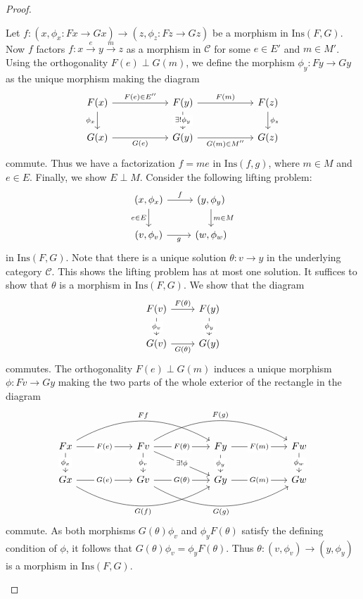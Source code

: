 \documentclass[11pt]{article}
\theoremstyle{plain}
\theoremstyle{definition}
\numberwithin{equation}{section}
\newcommand{\C}{\mathcal{C}}
\newcommand{\Ins}{\mathrm{Ins}}
\begin{document}
\begin{proof}
\begin{enumerate}
   Let $f\colon (x,\phi_x\colon Fx\to Gx)\to (z,\phi_z\colon Fz\to Gz)$ be a morphism in $\Ins(F,G)$. Now $f$ factors $f\colon x\xrightarrow{e}y\xrightarrow{m}z$ as a morphism in $\C$ for some $e\in E'$ and $m\in M'$. Using the orthogonality $F(e)\perp G(m)$, we define the morphism $\phi_y\colon Fy\to Gy$ as the unique morphism making the diagram
   $$
   \begin{tikzcd}[column sep = 2 cm]
F(x) \arrow[d, "\phi_x"'] \arrow[r, "F(e)\in E''"] & F(y) \arrow[d, "\exists!\phi_y" description] \arrow[r, "F(m)"] & F(z) \arrow[d, "\phi_z"] \\
G(x) \arrow[r, "G(e)"']                              & G(y) \arrow[r, "G(m)\in M''"']                                   & G(z)                      
\end{tikzcd}
   $$
   commute. Thus we have a factorization $f = me$ in $\Ins(f,g)$, where $m\in M$ and $e\in E$. Finally, we show $E\perp M$. Consider the following lifting problem:
   $$
   \begin{tikzcd}
(x,\phi_x) \arrow[d, "e\in E"'] \arrow[r, "f"] & (y,\phi_y) \arrow[d, "m\in M"] \\
(v,\phi_v) \arrow[r, "g"']                      & (w,\phi_w)                     
\end{tikzcd}
   $$
   in $\Ins(F,G)$. Note that there is a unique solution $\theta\colon v\to y$ in the underlying category $\C$. This shows the lifting problem has at most one solution. It suffices to show that $\theta$ is a morphism in $\Ins(F,G)$. We show that the diagram
   $$
   \begin{tikzcd}
F(v) \arrow[d, "\phi_v" description] \arrow[r, "F(\theta)"] & F(y) \arrow[d, "\phi_y" description] \\
G(v) \arrow[r, "G(\theta)"']                                  & G(y)                                  
\end{tikzcd}
   $$
   commutes. The orthogonality $F(e)\perp G(m)$ induces a unique morphism $\phi\colon Fv\to Gy$ making the two parts of the whole exterior of the rectangle in the diagram
   $$
\begin{tikzcd}[column sep = 2 cm]
Fx \arrow[d, "\phi_x" description] \arrow[r, "F(e)" description] \arrow[rr, "Ff", bend left] & Fv \arrow[r, "F(\theta)" description] \arrow[d, "\phi_v" description] \arrow[rd, "\exists!\phi" description] \arrow[rr, "F(g)", bend left] & Fy \arrow[r, "F(m)" description] \arrow[d, "\phi_y" description] & Fw \arrow[d, "\phi_w" description] \\
Gx \arrow[r, "G(e)" description] \arrow[rr, "G(f)"', bend right]                                & Gv \arrow[r, "G(\theta)" description] \arrow[rr, "G(g)"', bend right]                                                                         & Gy \arrow[r, "G(m)" description]                                    & Gw                                   
\end{tikzcd}
$$
   commute. As both morphisms $G(\theta)\phi_v$ and $\phi_yF(\theta)$ satisfy the defining condition of $\phi$, it follows that $G(\theta)\phi_v = \phi_y F(\theta)$. Thus $\theta\colon (v,\phi_v)\to (y,\phi_y)$ is a morphism in $\Ins(F,G)$. 
   

\end{enumerate}
\end{proof}
\end{document}
